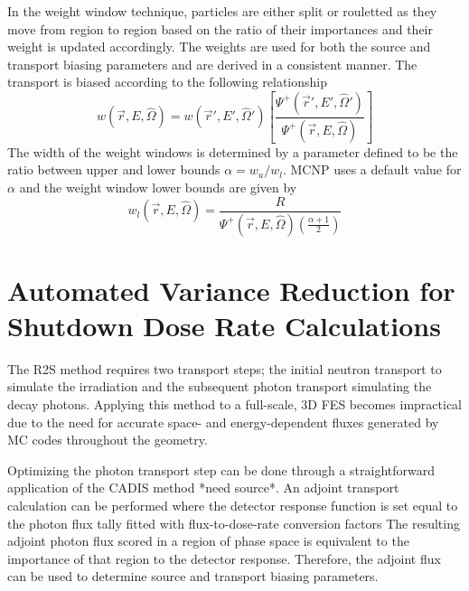 In the weight window technique, particles are either split or
rouletted as they move from region to region based on the ratio of their
importances and their weight is updated accordingly.  
The weights are used for both the source and transport biasing parameters and
are derived %
in a consistent manner.  
The transport is biased according to the following relationship
\begin{equation} \label{eq:3.11}
	w(\overrightarrow{r}, E, \widehat{\Omega})=
	w(\overrightarrow{r}', E', \widehat{\Omega}')
	\left [ \frac{\Psi^{+}(\overrightarrow{r}', E', \widehat{\Omega}')}
	{\Psi^{+}(\overrightarrow{r}, E, \widehat{\Omega})} \right ]
\end{equation}
The width of the weight windows is determined by a parameter defined to be the
ratio between upper and lower bounds $\alpha =
w_{u}/w_{l}$.  MCNP uses a default value for $\alpha$ and the weight window lower
bounds are given by 
\begin{equation} \label{eq:3.12}
	w_{l}(\overrightarrow{r}, E, \widehat{\Omega}) = 
	\frac{R}{\Psi^{+}(\overrightarrow{r}, E, \widehat{\Omega})
	(\frac{\alpha + 1}{2})}
\end{equation}


\section{Automated Variance Reduction for Shutdown Dose Rate Calculations}\label{sec:auto_vr_sdr}

The R2S method requires two transport steps; 
the initial neutron transport to simulate the irradiation and the subsequent photon
transport simulating the decay photons.  
Applying this method to a full-scale, 3D FES becomes impractical due to the
need for accurate space- and energy-dependent fluxes generated by MC codes 
throughout the geometry.  

Optimizing the photon transport step can be done through a
straightforward application of the CADIS %
method *need source*. 
An adjoint transport calculation can be performed where the detector
response function is set equal to the photon flux tally fitted with
flux-to-dose-rate conversion factors
The resulting adjoint photon flux scored in a region of phase space is equivalent
to the importance of that region to the detector response.
Therefore, the adjoint flux can be used to determine source and transport
biasing parameters.

